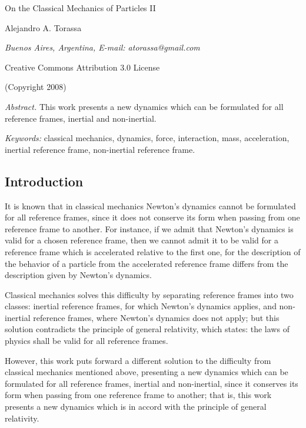 \documentclass[11pt]{article}
\begin{document}
\begin{center}

{\Large On the Classical Mechanics of Particles II}

\bigskip \bigskip

\small

Alejandro A. Torassa

\footnotesize

\bigskip

{\em Buenos Aires, Argentina, E-mail: atorassa@gmail.com}

\bigskip

Creative Commons Attribution 3.0 License

\bigskip

(Copyright 2008)

\end{center}

\bigskip

\footnotesize

{\em Abstract.\/} This work presents a new dynamics which can be formulated for all reference frames, inertial and non-inertial.

\bigskip

{\em Keywords:\/} classical mechanics, dynamics, force, interaction, mass, acceleration, inertial reference frame, non-inertial reference frame.

\normalsize

{\centering\subsection*{Introduction}}

\par It is known that in classical mechanics Newton's dynamics cannot be formulated for all reference frames, since it does not conserve its form when passing from one reference frame to another. For instance, if we admit that Newton's dynamics is valid for a chosen reference frame, then we cannot admit it to be valid for a reference frame which is accelerated relative to the first one, for the description of the behavior of a particle from the accelerated reference frame differs from the description given by Newton's dynamics.
\medskip
\par Classical mechanics solves this difficulty by separating reference frames into two classes: inertial reference frames, for which Newton's dynamics applies, and non-inertial reference frames, where Newton's dynamics does not apply; but this solution contradicts the principle of general relativity, which states: the laws of physics shall be valid for all reference frames.
\medskip
\par However, this work puts forward a different solution to the difficulty from classical mechanics mentioned above, presenting a new dynamics which can be formulated for all reference frames, inertial and non-inertial, since it conserves its form when passing from one reference frame to another; that is, this work presents a new dynamics which is in accord with the principle of general relativity.
\end{document}
